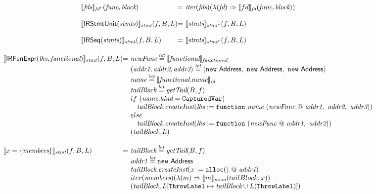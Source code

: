 \[\begin{array}{l@{}l@{~}l}
\transfun{\emph{fds}}_{\emph{fd}^{*}}(\emph{func}, \emph{block})
& = & \iter(\emph{fds})(\lambda(\emph{fd}) \Rightarrow \transfun{fd}_{\emph{fd}}(\emph{func}, \emph{block}))\\
& & \\

\transfun{\irstmtunit{\emph{stmts}}}_{\emph{stmt}}(f, B, L) & = &
\transfun{\emph{stmts}}_{\emph{stmt}^{*}}(f, B, L)\\
& & \\

\transfun{\irseq{\emph{stmts}}}_{\emph{stmt}}(f, B, L) & = &
\transfun{\emph{stmts}}_{\emph{stmt}^{*}}(f, B, L)\\
\end{array}
\]

\[
\begin{array}{l@{}l@{~}l}
\transfun{\SF{IRFunExpr}(\emph{lhs}, \emph{functional})}_{\emph{stmt}}(f, B, L)
& = & \emph{newFunc} \letval \transfun{\emph{functional}}_{\emph{functional}}\\
& & (\emph{addr1}, \emph{addr2}, \emph{addr3}) \letval (\new\ \Address,\ \new\ \Address,\ \new\ \Address)\\
& & \emph{name} \letval \transfun{\emph{functional}.\emph{name}}_{\emph{id}}\\
& & \emph{tailBlock} \letval \getTail(B, f)\\
& & if\ (\emph{name}.\emph{kind} = \TT{CapturedVar}) \\
& & \phantom{if} \emph{tailBlock}.\emph{createInst}(\emph{lhs} := \TT{function}\ \emph{name}\ (\emph{newFunc} ~@~ \emph{addr1},\ \emph{addr2},\ \emph{addr3}))\\
& & else\\
& & \phantom{if} \emph{tailBlock}.\emph{createInst}(\emph{lhs} := \TT{function}\ (\emph{newFunc} ~@~ \emph{addr1},\ \emph{addr2}))\\
& & (\emph{tailBlock}, L)\\
& & \\

\transfun{\irobject{x}{\emph{members}}}_{\emph{stmt}}(f, B, L)
& = & \emph{tailBlock} \letval \getTail(B, f)\\
& & \emph{addr1} \letval \new\ \Address\\
& & \emph{tailBlock}.\emph{createInst}(x := \TT{alloc}() ~@~ \emph{addr1})\\
& & iter(\emph{members})(\lambda(m) \Rightarrow \transfun{m}_{\emph{mem}}(tailBlock, x))\\
& & (\emph{tailBlock}, L[\ThrowLabel \mapsto \emph{tailBlock} \cup L(\ThrowLabel)])\\
& & \\


\end{array}\]

